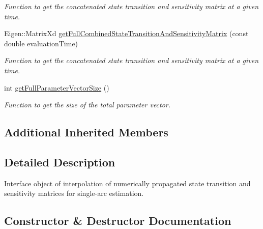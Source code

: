 \begin{DoxyCompactItemize}
\begin{DoxyCompactList}\small\item\em Function to get the concatenated state transition and sensitivity matrix at a given time. \end{DoxyCompactList}\item 
Eigen\+::\+Matrix\+Xd \hyperlink{classtudat_1_1propagators_1_1SingleArcCombinedStateTransitionAndSensitivityMatrixInterface_a436d658d8eabf9ec56497d81f7c2b11c}{get\+Full\+Combined\+State\+Transition\+And\+Sensitivity\+Matrix} (const double evaluation\+Time)
\begin{DoxyCompactList}\small\item\em Function to get the concatenated state transition and sensitivity matrix at a given time. \end{DoxyCompactList}\item 
int \hyperlink{classtudat_1_1propagators_1_1SingleArcCombinedStateTransitionAndSensitivityMatrixInterface_aeffc7ae729edd8188b499e969f712004}{get\+Full\+Parameter\+Vector\+Size} ()
\begin{DoxyCompactList}\small\item\em Function to get the size of the total parameter vector. \end{DoxyCompactList}\end{DoxyCompactItemize}
\subsection*{Additional Inherited Members}


\subsection{Detailed Description}
Interface object of interpolation of numerically propagated state transition and sensitivity matrices for single-\/arc estimation. 

\subsection{Constructor \& Destructor Documentation}
